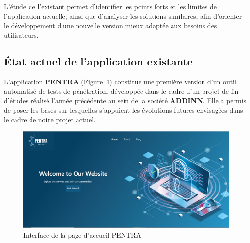 \vspace{-0.1cm}
L’étude de l’existant permet d’identifier les points forts et les limites de l’application actuelle, ainsi que d’analyser les solutions similaires, afin d’orienter le développement d’une nouvelle version mieux adaptée aux besoins des utilisateurs.
\subsection{État actuel de l'application existante}
    L’application \textbf{PENTRA} (Figure~\ref{fig:PENTRA-V1-1}) constitue une première version d’un outil automatisé de tests de pénétration, développée dans le cadre d’un projet de fin d’études réalisé l’année précédente au sein de la société \textbf{ADDINN}. Elle a permis de poser les bases sur lesquelles s’appuient les évolutions futures envisagées dans le cadre de notre projet actuel.    
    \begin{figure}[H]
        \centering
        \includegraphics[width=\linewidth]{Annexe/PENTRA-V1/1.PNG}
        \caption{\centering Interface de la page d'accueil PENTRA}
        \label{fig:PENTRA-V1-1}
    \end{figure}
    \vspace{-0.3cm}
